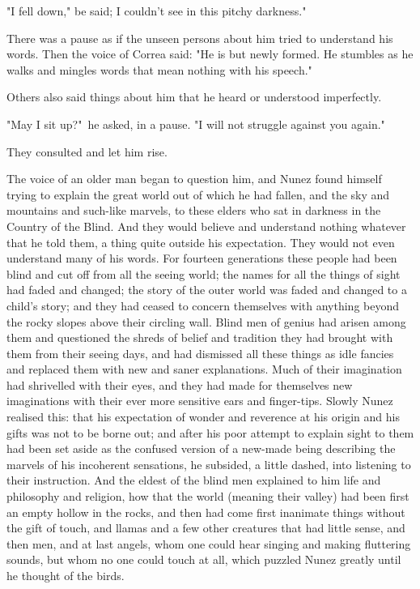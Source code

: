 \documentclass[courier]{sffms}
\begin{document}
"I fell down," be said; I couldn't see in this pitchy darkness."

There was a pause as if the unseen persons about him tried to
understand his words. Then the voice of Correa said: "He is but newly
formed. He stumbles as he walks and mingles words that mean nothing
with his speech."

Others also said things about him that he heard or understood
imperfectly.

"May I sit up?"\ he asked, in a pause. "I will not struggle against you
again."

They consulted and let him rise.

The voice of an older man began to question him, and Nunez found
himself trying to explain the great world out of which he had fallen,
and the sky and mountains and such-like marvels, to these elders who
sat in darkness in the Country of the Blind. And they would believe
and understand nothing whatever that he told them, a thing quite
outside his expectation. They would not even understand many of his
words. For fourteen generations these people had been blind and cut
off from all the seeing world; the names for all the things of sight
had faded and changed; the story of the outer world was faded and
changed to a child's story; and they had ceased to concern themselves
with anything beyond the rocky slopes above their circling wall. Blind
men of genius had arisen among them and questioned the shreds of
belief and tradition they had brought with them from their seeing
days, and had dismissed all these things as idle fancies and replaced
them with new and saner explanations. Much of their imagination had
shrivelled with their eyes, and they had made for themselves new
imaginations with their ever more sensitive ears and
finger-tips. Slowly Nunez realised this: that his expectation of
wonder and reverence at his origin and his gifts was not to be borne
out; and after his poor attempt to explain sight to them had been set
aside as the confused version of a new-made being describing the
marvels of his incoherent sensations, he subsided, a little dashed,
into listening to their instruction. And the eldest of the blind men
explained to him life and philosophy and religion, how that the world
(meaning their valley) had been first an empty hollow in the rocks,
and then had come first inanimate things without the gift of touch,
and llamas and a few other creatures that had little sense, and then
men, and at last angels, whom one could hear singing and making
fluttering sounds, but whom no one could touch at all, which puzzled
Nunez greatly until he thought of the birds.
\end{document}

